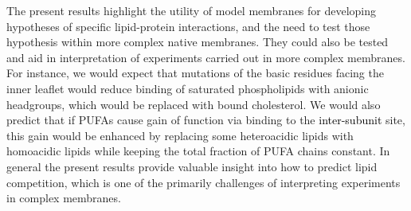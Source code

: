 \documentclass[%
 aip,
 amsmath,amssymb,
 preprint,%
]{revtex4-1}\usepackage{setspace}
\newcommand{\liam}[1]{\textcolor{black}{#1}}
\newcommand{\notsure}[1]{\textcolor{red}{#1}}
\newcommand{\nachr}{nAChR}
\begin{document}
The present results highlight the utility of model membranes for developing hypotheses of specific lipid-protein interactions, and the need to test those hypothesis within more complex native membranes. They could also be tested and aid in interpretation of experiments carried out in more complex membranes. For instance, we would expect that mutations of the basic residues facing the inner leaflet would reduce binding of saturated phospholipids with anionic headgroups, which would be replaced with bound cholesterol. We would also predict that if PUFAs cause gain of function via binding to the \liam{inter-subunit} site, this gain would be enhanced by replacing some heteroacidic lipids with homoacidic lipids while keeping the total fraction of PUFA chains constant. In general the present results provide valuable insight into how to predict lipid competition, which is one of the primarily challenges of interpreting experiments in complex membranes.  




%
\end{document}
